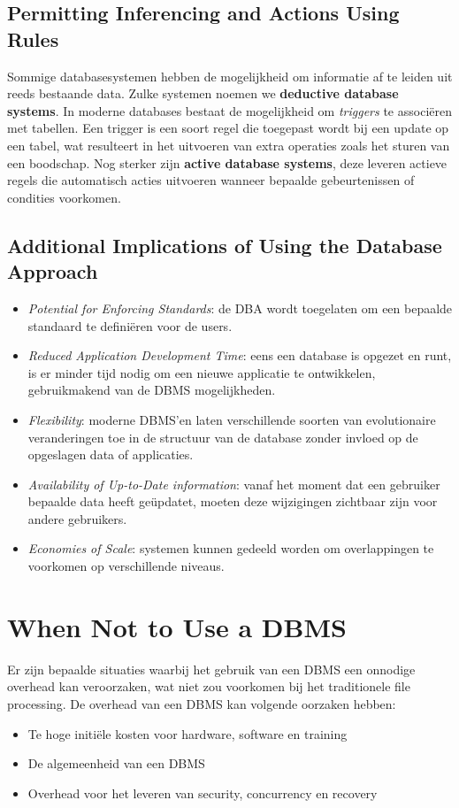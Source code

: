 \subsection{Permitting Inferencing and Actions Using Rules}
Sommige databasesystemen hebben de mogelijkheid om informatie af te leiden uit reeds bestaande data. Zulke systemen noemen we \textbf{deductive database systems}. In moderne databases bestaat de mogelijkheid om \textit{triggers} te associ\"eren met tabellen. Een trigger is een soort regel die toegepast wordt bij een update op een tabel, wat resulteert in het uitvoeren van extra operaties zoals het sturen van een boodschap. Nog sterker zijn \textbf{active database systems}, deze leveren actieve regels die automatisch acties uitvoeren wanneer bepaalde gebeurtenissen of condities voorkomen.

\subsection{Additional Implications of Using the Database Approach}
\begin{itemize}
\item \textit{Potential for Enforcing Standards}: de DBA wordt toegelaten om een bepaalde standaard te defini\"eren voor de users.
\item \textit{Reduced Application Development Time}: eens een database is opgezet en runt, is er minder tijd nodig om een nieuwe applicatie te ontwikkelen, gebruikmakend van de DBMS mogelijkheden.
\item \textit{Flexibility}: moderne DBMS'en laten verschillende soorten van evolutionaire veranderingen toe in de structuur van de database zonder invloed op de opgeslagen data of applicaties.
\item \textit{Availability of Up-to-Date information}: vanaf het moment dat een gebruiker bepaalde data heeft ge\"updatet, moeten deze wijzigingen zichtbaar zijn voor andere gebruikers. 
\item \textit{Economies of Scale}: systemen kunnen gedeeld worden om overlappingen te voorkomen op verschillende niveaus.
\end{itemize}


\setcounter{section}{7}
\section{When Not to Use a DBMS}
Er zijn bepaalde situaties waarbij het gebruik van een DBMS een onnodige overhead kan veroorzaken, wat niet zou voorkomen bij het traditionele file processing. De overhead van een DBMS kan volgende oorzaken hebben:
\begin{itemize}
\item Te hoge initi\"ele kosten voor hardware, software en training
\item De algemeenheid van een DBMS
\item Overhead voor het leveren van security, concurrency en recovery
\end{itemize}